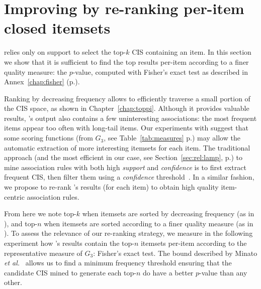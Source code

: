 \section{Improving \toppi by re-ranking per-item closed itemsets}
\label{sec:quali:pval}


\toppi relies only on support to select the top-$k$ CIS containing an item.
In this section we show that it is sufficient to find the top results per-item
according to a finer quality measure:
the $p$-value, computed with Fisher's exact test as described in Annex~\ref{chap:fisher} (p.\pageref{chap:fisher}).

Ranking by decreasing frequency allows \toppi  to efficiently traverse a small portion of the CIS space,
as shown in Chapter~\ref{chap:toppi}.
Although it provides valuable results,
\toppi's output also contains a few uninteresting associations:
the most frequent items appear too often with long-tail items.
Our experiments with \capa suggest that some scoring functions
(from $G_3$, see Table~\ref{tab:measures} p.\pageref{tab:measures})
may allow the automatic extraction of more interesting itemsets for each item.
The traditional approach
(and the most efficient in our case, see Section~\ref{sec:rel:lamp}, p.\pageref{sec:rel:lamp})
to mine association rules with both high {\em support} and {\em confidence} is to first extract frequent CIS,
then filter them using a {\em confidence} threshold~\cite{AgrawalVLDB94}.
In a similar fashion,
we propose to re-rank \toppi's results (for each item) to obtain high quality item-centric association rules.

From here we note top-$k$ when itemsets are sorted by decreasing frequency (as in \toppi),
and top-$n$ when itemsets are sorted according to a finer quality measure (as in \capa).
To assess the relevance of our re-ranking strategy,
we measure in the following experiment how \toppi's results contain
the top-$n$ itemsets per-item according to the representative measure of $G_3$: Fisher's exact test.
The bound described by Minato {\em et al.}~\cite{MinatoKDD14}
allows us to find a minimum frequency threshold ensuring that
the candidate CIS mined to generate each top-$n$ do have a better $p$-value than any other.

